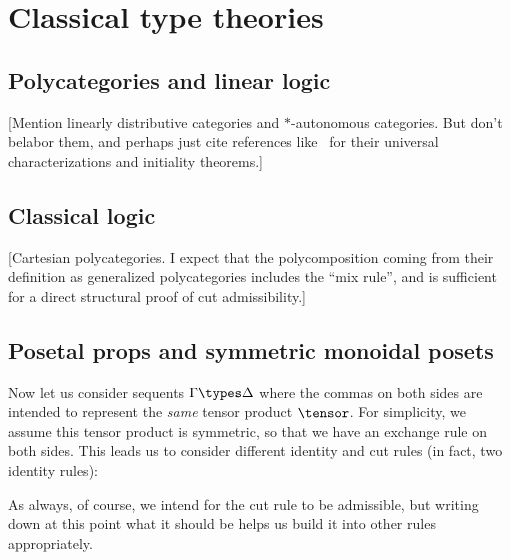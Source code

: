 \chapter{Classical type theories}
\label{chap:polycats}


\section{Polycategories and linear logic}
\label{sec:cllin}

[Mention linearly distributive categories and $\ast$-autonomous categories.
But don't belabor them, and perhaps just cite references like~\cite{cs:wkdistrib} for their universal characterizations and initiality theorems.]


\section{Classical logic}
\label{sec:classical}

[Cartesian polycategories.  I expect that the polycomposition coming from their definition as generalized polycategories includes the ``mix rule'', and is sufficient for a direct structural proof of cut admissibility.]


\section{Posetal props and symmetric monoidal posets}
\label{sec:proppos-smpos}

Now let us consider sequents $\Gamma\types\Delta$ where the commas on both sides are intended to represent the \emph{same} tensor product $\tensor$.
For simplicity, we assume this tensor product is symmetric, so that we have an exchange rule on both sides.
This leads us to consider different identity and cut rules (in fact, two identity rules):
As always, of course, we intend for the cut rule to be admissible, but writing down at this point what it should be helps us build it into other rules appropriately.

